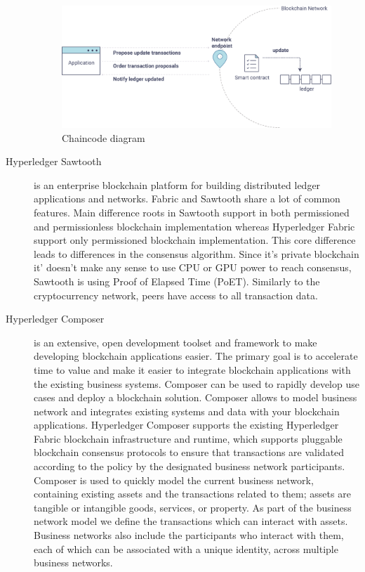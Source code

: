 \begin{description}
\begin{figure}[H]
    \begin{center}
        \begin{minipage}{\linewidth}
            \begin{center}
                \includegraphics[width=\textwidth,keepaspectratio]{img/chaincode.png}
                \caption{Chaincode diagram}
                \label{obr 1.2.1}
            \end{center}
        \end{minipage}
    \end{center}
\end{figure}


\item[Hyperledger Sawtooth] is an enterprise blockchain platform for building distributed ledger applications and networks. Fabric and Sawtooth share a lot of common features. Main difference roots in Sawtooth support in both permissioned and permissionless blockchain implementation whereas Hyperledger Fabric support only permissioned blockchain implementation. This core difference leads to differences in the consensus algorithm. Since it's private blockchain it' doesn't make any sense to use CPU or GPU power to reach consensus, Sawtooth is using Proof of Elapsed Time (PoET). Similarly to the cryptocurrency network, peers have access to all transaction data.

\item[Hyperledger Composer] is an extensive, open development toolset and framework to make developing blockchain applications easier. The primary goal is to accelerate time to value and make it easier to integrate blockchain applications with the existing business systems. Composer can be used to rapidly develop use cases and deploy a blockchain solution. Composer allows to model business network and integrates existing systems and data with your blockchain applications. Hyperledger Composer supports the existing Hyperledger Fabric blockchain infrastructure and runtime, which supports pluggable blockchain consensus protocols to ensure that transactions are validated according to the policy by the designated business network participants. Composer is used to quickly model the current business network, containing existing assets and the transactions related to them; assets are tangible or intangible goods, services, or property. As part of the business network model we define the transactions which can interact with assets. Business networks also include the participants who interact with them, each of which can be associated with a unique identity, across multiple business networks. \cite{composer}


\end{description}
